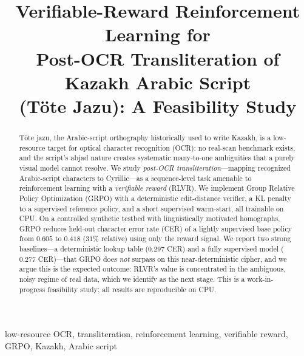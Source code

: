 \documentclass[conference]{IEEEtran}
\begin{document}
\title{Verifiable-Reward Reinforcement Learning for\\ Post-OCR Transliteration of Kazakh Arabic Script\\ (T\"ote Jazu): A Feasibility Study}

\author{
}

\maketitle

\begin{abstract}
T\"ote jazu, the Arabic-script orthography historically used to write Kazakh, is a
low-resource target for optical character recognition (OCR): no real-scan
benchmark exists, and the script's abjad nature creates systematic
many-to-one ambiguities that a purely visual model cannot resolve. We study
\emph{post-OCR transliteration}---mapping recognized Arabic-script characters to
Cyrillic---as a sequence-level task amenable to reinforcement learning with a
\emph{verifiable reward} (RLVR). We implement Group Relative Policy Optimization
(GRPO) with a deterministic edit-distance verifier, a KL penalty to a supervised
reference policy, and a short supervised warm-start, all trainable on CPU. On a
controlled synthetic testbed with linguistically motivated homographs, GRPO
reduces held-out character error rate (CER) of a lightly supervised base policy
from $0.605$ to $0.418$ ($31\%$ relative) using only the reward signal. We report
two strong baselines---a deterministic lookup table ($0.297$ CER) and a fully
supervised model ($0.277$ CER)---that GRPO does \emph{not} surpass on this
near-deterministic cipher, and we argue this is the expected outcome: RLVR's
value is concentrated in the ambiguous, noisy regime of real data, which we
identify as the next stage. This is a work-in-progress feasibility study; all
results are reproducible on CPU.
\end{abstract}

\begin{IEEEkeywords}
low-resource OCR, transliteration, reinforcement learning, verifiable reward,
GRPO, Kazakh, Arabic script
\end{IEEEkeywords}
\end{document}
